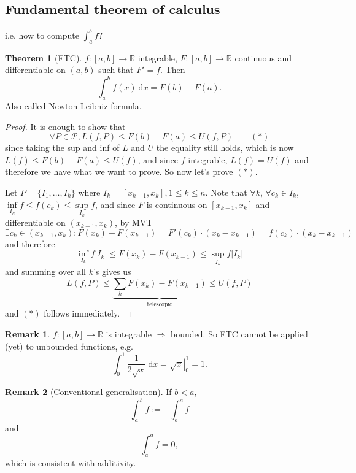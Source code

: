 \documentclass[a4paper]{article}
\theoremstyle{definition}
\newtheorem{thm}[defn]{Theorem}
\newtheorem*{remark}{Remark}
\begin{document}
\subsection{Fundamental theorem of calculus}
i.e. how to compute $\int_a^b f$?
\begin{thm}[FTC]
$f:[a,b]\rightarrow \mathbb R$ integrable, $F:[a,b]\rightarrow \mathbb R$ continuous and differentiable on $(a,b)$ such that $F'=f$. Then
\[
\int_a^b f(x) \ \mathrm d x = F(b)-F(a) .
\]
Also called Newton-Leibniz formula.
\end{thm}
\begin{proof}
It is enough to show that
\[
\forall P\in \mathcal P, L(f,P)\leq F(b)-F(a)\leq U(f,P) \qquad (\ast)
\]
since taking the sup and inf of $L$ and $U$ the equality still holds, which is now $L(f)\leq F(b)-F(a)\leq U(f)$, and since $f$ integrable, $L(f)=U(f)$ and therefore we have what we want to prove. So now let's prove $(\ast)$.

Let $P=\{I_1,\ldots,I_k\}$ where $I_k=[x_{k-1},x_k], 1\leq k\leq n$. Note that $\forall k$, $\forall c_k\in I_k$, $\underset{I_k}{\inf} f\leq f(c_k)\leq \underset{I_k}{\sup} f$, and since $F$ is continuous on $[x_{k-1},x_k]$ and differentiable on $(x_{k-1},x_k)$, by MVT
\[
\exists c_k\in (x_{k-1},x_k) : F(x_k)-F(x_{k-1})=F'(c_k)\cdot (x_k-x_{k-1})=f(c_k)\cdot (x_k-x_{k-1})
\]
and therefore
\[
\underset{I_k}{\inf} f |I_k|\leq F(x_k)-F(x_{k-1})\leq \underset{I_k}{\sup} f |I_k|
\]
and summing over all $k$'s gives us
\[
L(f,P)\leq \underbrace{\sum_k F(x_k)-F(x_{k-1})}_{\text{telescopic}}\leq U(f,P)
\]
and $(\ast)$ follows immediately.
\end{proof}
\begin{remark}
$f:[a,b]\rightarrow \mathbb R$ is integrable $\Rightarrow$ bounded. So FTC cannot be applied (yet) to unbounded functions, e.g.
\[
\int_0^1 \frac{1}{2\sqrt x} \ \mathrm d x = \left. \sqrt x \right|_0^1=1 .
\]
\end{remark}

\begin{remark}[Conventional generalisation]
If $b<a$,
\[
\int_a^b f := -\int_b^a f
\]
and
\[
\int_a^a f=0,
\]
which is consistent with additivity.
\end{remark}
\end{document}
